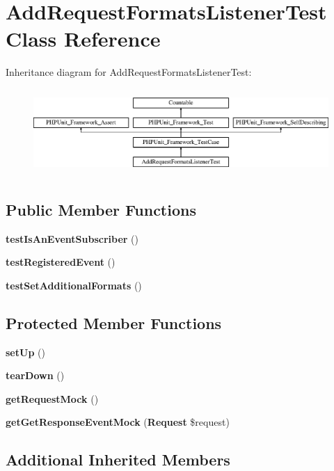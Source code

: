 \section{Add\+Request\+Formats\+Listener\+Test Class Reference}
\label{class_symfony_1_1_component_1_1_http_kernel_1_1_tests_1_1_event_listener_1_1_add_request_formats_listener_test}
Inheritance diagram for Add\+Request\+Formats\+Listener\+Test\+:\begin{figure}[H]
\begin{center}
\leavevmode
\includegraphics[height=3.303835cm]{class_symfony_1_1_component_1_1_http_kernel_1_1_tests_1_1_event_listener_1_1_add_request_formats_listener_test}
\end{center}
\end{figure}
\subsection*{Public Member Functions}
\begin{DoxyCompactItemize}
\item 
{\bf test\+Is\+An\+Event\+Subscriber} ()
\item 
{\bf test\+Registered\+Event} ()
\item 
{\bf test\+Set\+Additional\+Formats} ()
\end{DoxyCompactItemize}
\subsection*{Protected Member Functions}
\begin{DoxyCompactItemize}
\item 
{\bf set\+Up} ()
\item 
{\bf tear\+Down} ()
\item 
{\bf get\+Request\+Mock} ()
\item 
{\bf get\+Get\+Response\+Event\+Mock} ({\bf Request} \$request)
\end{DoxyCompactItemize}
\subsection*{Additional Inherited Members}


